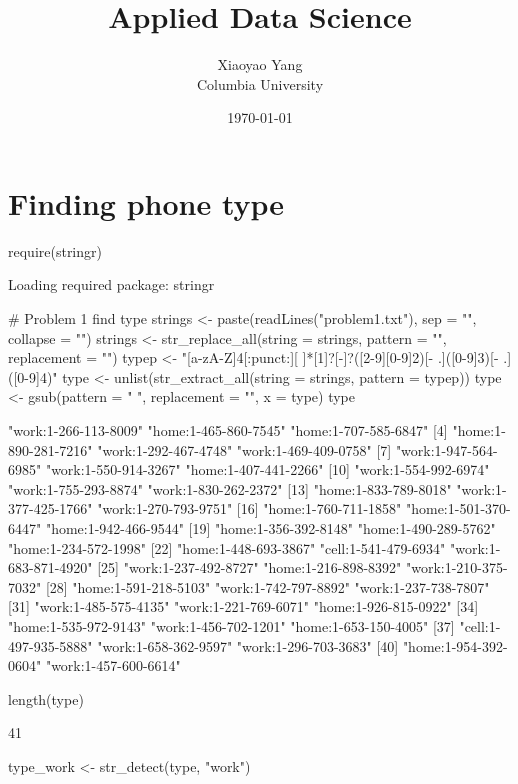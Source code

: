 \documentclass[11pt]{article}\usepackage[]{graphicx}\usepackage[]{color}
\title{Applied Data Science}
\author{Xiaoyao Yang\\ Columbia University}
\date{\today}
\begin{document}
\maketitle


\section{Finding phone type}
\begin{Schunk}
\begin{Sinput}
require(stringr)
\end{Sinput}
\begin{Soutput}
Loading required package: stringr
\end{Soutput}
\begin{Sinput}
# Problem 1 find type
strings <- paste(readLines("problem1.txt"), sep = "", collapse = "\n")
strings <- str_replace_all(string = strings, pattern = "\n", replacement = "")
typep <- "[a-zA-Z]{4}[:punct:][ ]*[1]?[-]?([2-9][0-9]{2})[- .]([0-9]{3})[- .]([0-9]{4})"
type <- unlist(str_extract_all(string = strings, pattern = typep))
type <- gsub(pattern = " ", replacement = "", x = type)
type
\end{Sinput}
\begin{Soutput}
 [1] "work:1-266-113-8009" "home:1-465-860-7545" "home:1-707-585-6847"
 [4] "home:1-890-281-7216" "work:1-292-467-4748" "work:1-469-409-0758"
 [7] "work:1-947-564-6985" "work:1-550-914-3267" "home:1-407-441-2266"
[10] "work:1-554-992-6974" "work:1-755-293-8874" "work:1-830-262-2372"
[13] "home:1-833-789-8018" "work:1-377-425-1766" "work:1-270-793-9751"
[16] "home:1-760-711-1858" "home:1-501-370-6447" "home:1-942-466-9544"
[19] "home:1-356-392-8148" "home:1-490-289-5762" "home:1-234-572-1998"
[22] "home:1-448-693-3867" "cell:1-541-479-6934" "work:1-683-871-4920"
[25] "work:1-237-492-8727" "home:1-216-898-8392" "work:1-210-375-7032"
[28] "home:1-591-218-5103" "work:1-742-797-8892" "work:1-237-738-7807"
[31] "work:1-485-575-4135" "work:1-221-769-6071" "home:1-926-815-0922"
[34] "home:1-535-972-9143" "work:1-456-702-1201" "home:1-653-150-4005"
[37] "cell:1-497-935-5888" "work:1-658-362-9597" "work:1-296-703-3683"
[40] "home:1-954-392-0604" "work:1-457-600-6614"
\end{Soutput}
\begin{Sinput}
length(type)
\end{Sinput}
\begin{Soutput}
[1] 41
\end{Soutput}
\begin{Sinput}
type_work <- str_detect(type, "work")

\end{Sinput}
\end{Schunk}
\end{document}

